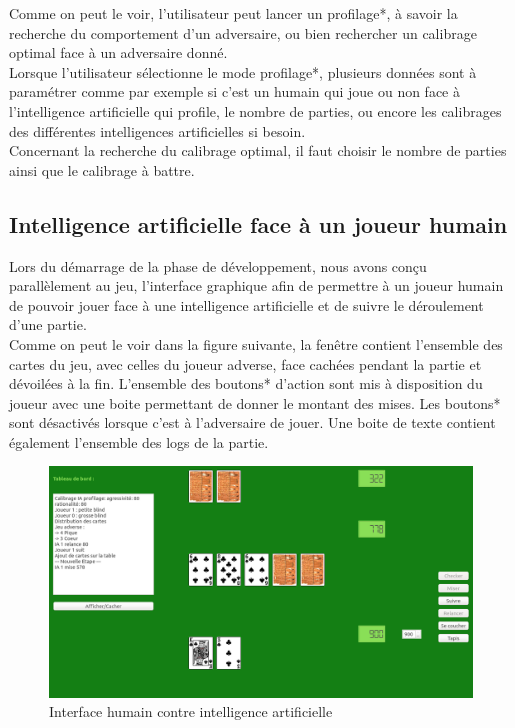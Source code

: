 \documentclass{report}
\begin{document}
Comme on peut le voir, l'utilisateur peut lancer un profilage*, à savoir la recherche du comportement d'un adversaire, ou bien rechercher un calibrage optimal face à un adversaire donné.\\

Lorsque l'utilisateur sélectionne le mode profilage*, plusieurs données sont à paramétrer comme par exemple si c'est un humain qui joue ou non face à l'intelligence artificielle qui profile, le nombre de parties, ou encore les calibrages des différentes intelligences artificielles si besoin.\\

Concernant la recherche du calibrage optimal, il faut choisir le nombre de parties ainsi que le calibrage à battre.\\

\subsection{Intelligence artificielle face à un joueur humain}

\hspace{0.5cm}Lors du démarrage de la phase de développement, nous avons conçu parallèlement au jeu, l'interface graphique afin de permettre à un joueur humain de pouvoir jouer face à une intelligence artificielle et de suivre le déroulement d'une partie.\\

Comme on peut le voir dans la figure suivante, la fenêtre contient l'ensemble des cartes du jeu, avec celles du joueur adverse, face cachées pendant la partie et dévoilées à la fin. L'ensemble des boutons* d'action sont mis à disposition du joueur avec une boite permettant de donner le montant des mises. Les boutons* sont désactivés lorsque c'est à l'adversaire de jouer. Une boite de texte contient également l'ensemble des logs de la partie.\par 

\begin{figure}[H]
\hspace{-0.5cm}
		\includegraphics[scale=0.3]{./imagesRapport/interfaceGraphiqueHumain.png}
	\caption[Interface humain contre intelligence artificielle]{Interface humain contre intelligence artificielle}
\end{figure}
\end{document}
